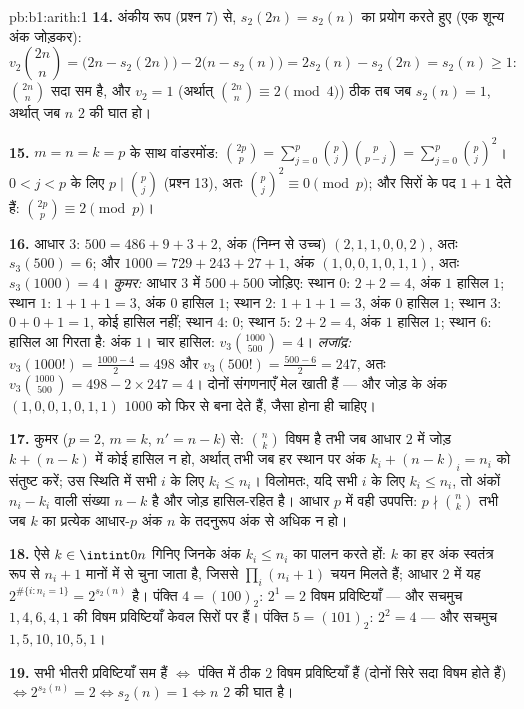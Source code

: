 \begin{solution}{pb:b1:arith:1}
\textbf{14.} अंकीय रूप (प्रश्न 7) से, $s_2(2n) = s_2(n)$ का प्रयोग करते हुए
(एक शून्य अंक जोड़कर):
\[
v_2\binom{2n}n = \bigl(2n - s_2(2n)\bigr) - 2\bigl(n -
s_2(n)\bigr) = 2s_2(n) - s_2(2n) = s_2(n) \geq 1 :
\]
$\binom{2n}n$ सदा सम है, और $v_2 = 1$ (अर्थात् $\binom{2n}n \equiv 2 \pmod
4$) ठीक तब जब $s_2(n) = 1$, अर्थात् जब $n$ $2$ की घात हो।

\textbf{15.} $m = n = k = p$ के साथ वांडरमोंड: $\binom{2p}p = \sum_{j=0}^p
\binom pj\binom p{p-j} = \sum_{j=0}^p \binom pj^2$। $0 < j < p$ के लिए $p
\mid \binom pj$ (प्रश्न 13), अतः $\binom pj^2 \equiv 0 \pmod p$; और सिरों के
पद $1 + 1$ देते हैं: $\binom{2p}p \equiv 2 \pmod p$।

\textbf{16.} आधार $3$: $500 = 486 + 9 + 3 + 2$, अंक (निम्न से उच्च) $(2, 1,
1, 0, 0, 2)$, अतः $s_3(500) = 6$; और $1000 = 729 + 243 + 27 + 1$, अंक $(1,
0, 0, 1, 0, 1, 1)$, अतः $s_3(1000) = 4$। \emph{कुमर:} आधार $3$ में $500 +
500$ जोड़िए: स्थान $0$: $2 + 2 = 4$, अंक $1$ हासिल $1$; स्थान $1$: $1 + 1 +
1 = 3$, अंक $0$ हासिल $1$; स्थान $2$: $1 + 1 + 1 = 3$, अंक $0$ हासिल $1$;
स्थान $3$: $0 + 0 + 1 = 1$, कोई हासिल नहीं; स्थान $4$: $0$; स्थान $5$: $2 +
2 = 4$, अंक $1$ हासिल $1$; स्थान $6$: हासिल आ गिरता है: अंक $1$। चार हासिल:
$v_3\binom{1000}{500} = 4$। \emph{लजांद्र:} $v_3(1000!) = \frac{1000 - 4}2 =
498$ और $v_3(500!) = \frac{500 - 6}2 = 247$, अतः $v_3\binom{1000}{500} = 498
- 2\times247 = 4$। दोनों संगणनाएँ मेल खाती हैं --- और जोड़ के अंक $(1, 0, 0,
1, 0, 1, 1)$ $1000$ को फिर से बना देते हैं, जैसा होना ही चाहिए।

\textbf{17.} कुमर ($p = 2$, $m = k$, $n' = n - k$) से: $\binom nk$ विषम है
तभी जब आधार $2$ में जोड़ $k + (n - k)$ में कोई हासिल न हो, अर्थात् तभी जब हर
स्थान पर अंक $k_i + (n - k)_i = n_i$ को संतुष्ट करें; उस स्थिति में सभी $i$
के लिए $k_i \leq n_i$। विलोमतः, यदि सभी $i$ के लिए $k_i \leq n_i$, तो अंकों
$n_i - k_i$ वाली संख्या $n - k$ है और जोड़ हासिल-रहित है। आधार $p$ में वही
उपपत्ति: $p \nmid \binom nk$ तभी जब $k$ का प्रत्येक आधार-$p$ अंक $n$ के
तदनुरूप अंक से अधिक न हो।

\textbf{18.} ऐसे $k \in \intint0n$ गिनिए जिनके अंक $k_i \leq n_i$ का पालन
करते हों: $k$ का हर अंक स्वतंत्र रूप से $n_i + 1$ मानों में से चुना जाता है,
जिससे $\prod_i (n_i + 1)$ चयन मिलते हैं; आधार $2$ में यह $2^{\#\{i : n_i =
1\}} = 2^{s_2(n)}$ है। पंक्ति $4 = (100)_2$: $2^1 = 2$ विषम प्रविष्टियाँ ---
और सचमुच $1, 4, 6, 4, 1$ की विषम प्रविष्टियाँ केवल सिरों पर हैं। पंक्ति $5 =
(101)_2$: $2^2 = 4$ --- और सचमुच $1, 5, 10, 10, 5, 1$।

\textbf{19.} सभी भीतरी प्रविष्टियाँ सम हैं $\iff$ पंक्ति में ठीक $2$ विषम
प्रविष्टियाँ हैं (दोनों सिरे सदा विषम होते हैं) $\iff 2^{s_2(n)} = 2 \iff
s_2(n) = 1 \iff n$ $2$ की घात है।


\end{solution}
